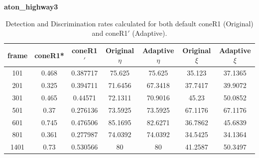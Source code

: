 \begin{appendices}
\begin{table}
\centering
\caption{\textbf{aton\_highway3}}
\begin{tabular}{ |c|c|c|c|c|c|c| }
\hline
\textbf{frame} &  \textbf{coneR1*} &  \textbf{coneR1$'$} &  \textbf{Original $\eta$} &  \textbf{Adaptive $\eta$} &  \textbf{Original $\xi$} &  \textbf{Adaptive $\xi$} \\
\hline
101 &  0.468 &  0.387717 &  75.625 &  75.625 &  35.123 &  37.1365 \\
\hline
201 &  0.325 &  0.394711 &  71.6456 &  67.3418 &  37.7417 &  39.9072 \\
\hline
301 &  0.465 &  0.44571 &  72.1311 &  70.9016 &  45.23 &  50.0852 \\
\hline
501 &  0.37 &  0.276136 &  73.5925 &  73.5925 &  67.1176 &  67.1176 \\
\hline
601 &  0.745 &  0.476506 &  85.1695 &  82.6271 &  36.7862 &  45.6839 \\
\hline
801 &  0.361 &  0.277987 &  74.0392 &  74.0392 &  34.5425 &  34.1364 \\
\hline
1401 &  0.73 &  0.530566 &  80 &  80 &  41.2587 &  50.3497 \\
\hline

\end{tabular}
\caption*{Detection and Discrimination rates calculated for both default coneR1 (Original) and coneR1$'$ (Adaptive).}
\end{table}


\end{appendices}

